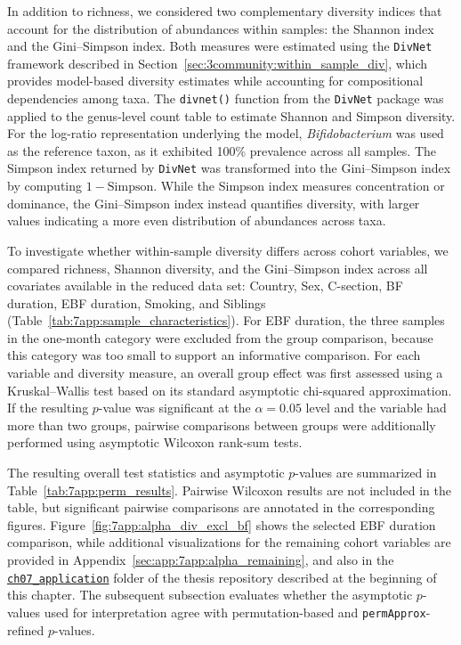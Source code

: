 In addition to richness, we considered two complementary diversity indices that account for the distribution of abundances within samples: the Shannon index and the Gini--Simpson index. Both measures were estimated using the \texttt{DivNet} framework described in Section~\ref{sec:3community:within_sample_div}, which provides model-based diversity estimates while accounting for compositional dependencies among taxa. The \texttt{divnet()} function from the \texttt{DivNet} package \citep{willis2018divnet} was applied to the genus-level count table to estimate Shannon and Simpson diversity. For the log-ratio representation underlying the model, \textit{Bifidobacterium} was used as the reference taxon, as it exhibited 100\% prevalence across all samples. The Simpson index returned by \texttt{DivNet} was transformed into the Gini--Simpson index by computing $1 - \text{Simpson}$. While the Simpson index measures concentration or dominance, the Gini--Simpson index instead quantifies diversity, with larger values indicating a more even distribution of abundances across taxa.

To investigate whether within-sample diversity differs across cohort variables, we compared richness, Shannon diversity, and the Gini--Simpson index across all covariates available in the reduced data set: Country, Sex, C-section, BF duration, EBF duration, Smoking, and Siblings (Table~\ref{tab:7app:sample_characteristics}). For EBF duration, the three samples in the one-month category were excluded from the group comparison, because this category was too small to support an informative comparison. For each variable and diversity measure, an overall group effect was first assessed using a Kruskal--Wallis test based on its standard asymptotic chi-squared approximation. If the resulting $p$-value was significant at the $\alpha = 0.05$ level and the variable had more than two groups, pairwise comparisons between groups were additionally performed using asymptotic Wilcoxon rank-sum tests.

The resulting overall test statistics and asymptotic $p$-values are summarized in Table~\ref{tab:7app:perm_results}. Pairwise Wilcoxon results are not included in the table, but significant pairwise comparisons are annotated in the corresponding figures. Figure~\ref{fig:7app:alpha_div_excl_bf} shows the selected EBF duration comparison, while additional visualizations for the remaining cohort variables are provided in Appendix~\ref{sec:app:7app:alpha_remaining}, and also in the \href{https://github.com/stefpeschel/phd_thesis/tree/main/ch07_application}{\texttt{ch07\_application}} folder of the thesis repository described at the beginning of this chapter. The subsequent subsection evaluates whether the asymptotic $p$-values used for interpretation agree with permutation-based and \texttt{permApprox}-refined $p$-values.


